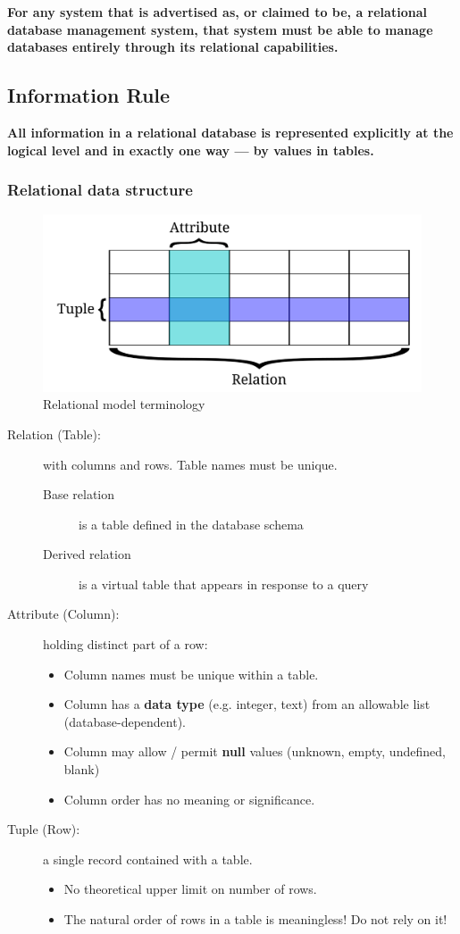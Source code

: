 \documentclass[slides]{pgnotes}
\begin{document}
\textbf{For any system that is advertised as, or claimed to be, a relational database management system, that system must be able to manage databases entirely through its relational capabilities.}
  
\subsection{Information Rule}
  
\textbf{All information in a relational database is represented explicitly at the logical level and in exactly one way --- by values in tables.}

\subsubsection{Relational data structure}

\begin{figure}[htbp]
  \centering
  \includegraphics[width=0.5\linewidth]{rdbms_terms}
  \caption{Relational model terminology}
  \label{fig:rdbms-terms}
\end{figure}

\begin{description}
\item[Relation (Table):] with columns and rows. Table names must be unique.
  \begin{description}
  \item[Base relation] is a table defined in the database schema
  \item[Derived relation] is a virtual table that appears in response to a query
  \end{description}
\item[Attribute (Column):] holding distinct part of a row: 
  \begin{itemize}
  \item Column names must be unique within a table.
  \item Column has a \textbf{data type} (e.g. integer, text) from an allowable list (database-dependent).
  \item Column may allow / permit \textbf{null} values (unknown, empty, undefined, blank)
  \item Column order has no meaning or significance.
  \end{itemize}
\item[Tuple (Row):] a single record contained with a table.
  \begin{itemize}
  \item No theoretical upper limit on number of rows.
  \item The natural order of rows in a table is meaningless!  Do not rely on it!
  \end{itemize}
\end{description}
\end{document}
